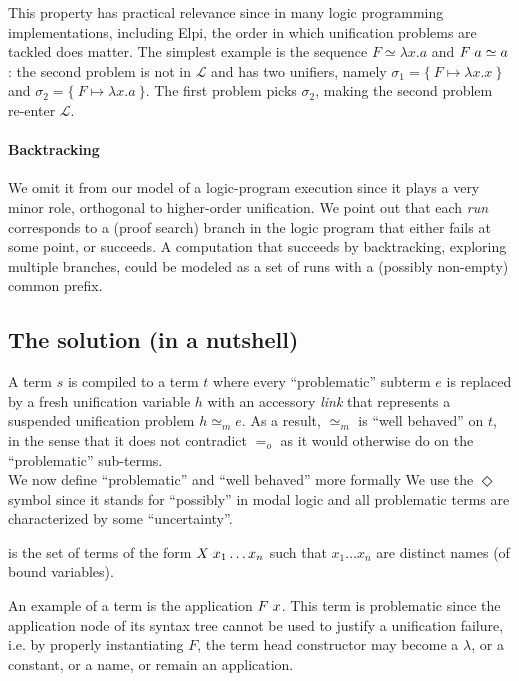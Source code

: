 \documentclass[sigconf,natbib=false,review]{acmart}
\newcommand{\appsep}{\ensuremath{\textcolor{lightgray}{\cdot}}}
\newcommand{\EqualRel}{\ensuremath{=}}
\newcommand{\UnifRel}{\ensuremath{\simeq}}
\newcommand{\Eo}{\ensuremath{\EqualRel_o}\xspace}
\newcommand{\Ue}{\ensuremath{\UnifRel_m}\xspace}
\newcommand{\llambda}{\ensuremath{\mathcal{L}}\xspace}
\begin{document}
This property has practical relevance since in many logic programming
implementations, including Elpi, the order in which unification problems
are tackled does matter.
The simplest example is the sequence $F \UnifRel \lambda x.a$ and
$F \appsep a \UnifRel a$: the second problem is not in \llambda and has two
unifiers, namely $\sigma_1 = \{~ F \mapsto \lambda x.x ~\}$ and
$\sigma_2 = \{~ F \mapsto \lambda x.a ~\}$. The first problem picks $\sigma_2$,
making the second problem re-enter \llambda.

\paragraph{Backtracking} We omit it from our model of a logic-program execution
since it plays a very minor role, orthogonal to higher-order unification.
We point out that each \emph{run} corresponds to a (proof search) branch in the
logic program that either fails at some point, or succeeds. A computation that
succeeds by backtracking, exploring multiple branches, could be
modeled as a set of runs with a (possibly non-empty) common prefix.

\subsection{The solution (in a nutshell)}
\label{sec:nutshell}
A term $s$ is compiled to a term $t$ where every
``problematic'' subterm $e$ is replaced by a fresh unification variable $h$
with an accessory \emph{link} that represents a suspended unification problem
$h \Ue e$. As a result, \Ue is ``well behaved'' on $t$, in the sense that
it does not contradict \Eo as it would otherwise do on the
``problematic'' sub-terms.\\
We now define ``problematic'' and ``well behaved'' more formally
We use the $\Diamond$ symbol since it stands for ``possibly'' in modal logic
and all problematic terms are characterized by some ``uncertainty''.

\begin{definition}[\maybebeta]\label{def:maybebeta}
  \maybebeta is the set of terms of the form $X \appsep x_1 \ldots x_n$
  such that $x_1 \ldots x_n$ are distinct names (of bound variables).
\end{definition}

\noindent
An example of a \maybebeta{} term is the application $F \appsep x$.
This term is problematic since the application node of 
its syntax tree cannot be used to justify a
unification failure, i.e. by properly instantiating $F$, the term
head constructor may become a $\lambda$, or a constant, or a name, or remain an application.
\end{document}
